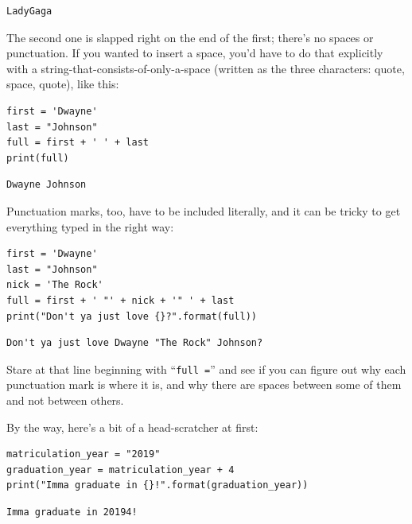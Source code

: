 \begin{Verbatim}[fontsize=\small,samepage=true,frame=leftline,framesep=5mm,framerule=1mm]
LadyGaga
\end{Verbatim}

The second one is slapped right on the end of the first; there's no spaces or
punctuation. If you wanted to insert a space, you'd have to do that explicitly
with a string-that-consists-of-only-a-space (written as the three characters:
quote, space, quote), like this:

\begin{Verbatim}[fontsize=\small,samepage=true,frame=single,framesep=3mm]
first = 'Dwayne'
last = "Johnson"
full = first + ' ' + last
print(full)
\end{Verbatim}

\begin{Verbatim}[fontsize=\small,samepage=true,frame=leftline,framesep=5mm,framerule=1mm]
Dwayne Johnson
\end{Verbatim}

Punctuation marks, too, have to be included literally, and it can be tricky to
get everything typed in the right way:

\begin{Verbatim}[fontsize=\small,samepage=true,frame=single,framesep=3mm]
first = 'Dwayne'
last = "Johnson"
nick = 'The Rock'
full = first + ' "' + nick + '" ' + last
print("Don't ya just love {}?".format(full))
\end{Verbatim}

\begin{Verbatim}[fontsize=\small,samepage=true,frame=leftline,framesep=5mm,framerule=1mm]
Don't ya just love Dwayne "The Rock" Johnson?
\end{Verbatim}

Stare at that line beginning with ``\texttt{full =}'' and see if you can figure
out why each punctuation mark is where it is, and why there are spaces between
some of them and not between others.

By the way, here's a bit of a head-scratcher at first:

\begin{Verbatim}[fontsize=\small,samepage=true,frame=single,framesep=3mm]
matriculation_year = "2019"
graduation_year = matriculation_year + 4
print("Imma graduate in {}!".format(graduation_year))
\end{Verbatim}

\begin{Verbatim}[fontsize=\small,samepage=true,frame=leftline,framesep=5mm,framerule=1mm]
Imma graduate in 20194!
\end{Verbatim}

